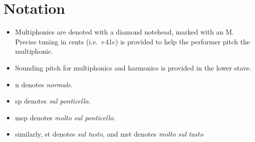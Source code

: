 \section*{Notation}
\begin{itemize}

    \item Multiphonics are denoted with a diamond notehead, marked with an M. Precise tuning in cents (i.e. +41c) is provided to help the performer pitch the multiphonic.
    \item Sounding pitch for multiphonics and harmonics is provided in the lower stave.
    \item n denotes \emph{normale}.
    \item sp denotes \emph{sul ponticello}.
    \item msp denotes \emph{molto sul ponticello}.
    \item similarly, st denotes \emph{sul tasto}, and mst denotes \emph{molto sul tasto}
\end{itemize}

\newpage\label{app:to/do Score}

